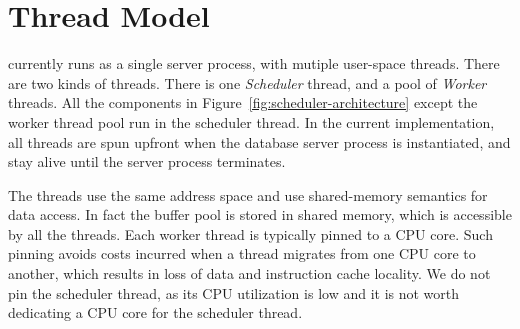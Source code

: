 %

\section{Thread Model}\label{apx:thread}
\sys{} currently runs as a single server process, with mutiple user-space threads. 
There are two kinds of threads. 
There is one \textit{Scheduler} thread, and a pool of \textit{Worker} threads. 
All the components in 
Figure~\ref{fig:scheduler-architecture} except the worker thread pool run in the 
scheduler thread. 
In the current implementation, all threads are spun upfront when the database server 
process is instantiated, and stay alive until the server process terminates.

The threads use the same address space and use shared-memory semantics for data 
access. 
In fact the buffer pool is stored in shared memory, which is accessible by all the threads. 
Each worker thread is typically pinned to a CPU core. 
Such pinning avoids costs incurred when a thread migrates from one CPU core to another, which results in loss of data and instruction cache locality. 
We do not pin the scheduler thread, as its CPU utilization is low and it is not worth dedicating a CPU core for the scheduler thread.

